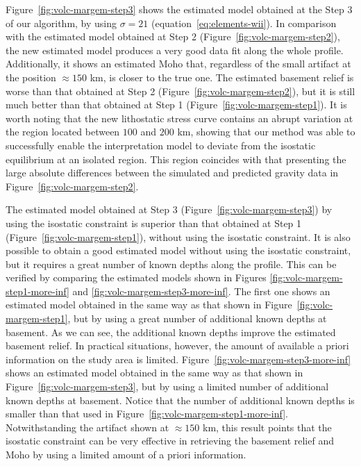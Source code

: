 \documentclass[manuscript]{geophysics}
\begin{document}
Figure~\ref{fig:volc-margem-step3} shows the estimated model obtained at the Step 3
of our algorithm, by using $\sigma = 21$ (equation~\ref{eq:elements-wii}). 
In comparison with the estimated model obtained at Step 2 
(Figure~\ref{fig:volc-margem-step2}), the new estimated model produces a very good 
data fit along the whole profile. Additionally, it shows an estimated Moho that,
regardless of the small artifact at the position $\approx 150$ km, is
closer to the true one.
The estimated basement relief is worse than that obtained at Step 2
(Figure~\ref{fig:volc-margem-step2}), but it is still much better than that obtained
at Step 1 (Figure~\ref{fig:volc-margem-step1}).
It is worth noting that the new lithostatic stress curve contains an abrupt variation
at the region located between $100$ and $200$ km,
showing that our method was able to successfully enable 
the interpretation model to deviate from the isostatic equilibrium at an
isolated region. This region coincides with that presenting the large absolute 
differences between the simulated and predicted gravity data in Figure~\ref{fig:volc-margem-step2}.

The estimated model obtained at Step 3 (Figure~\ref{fig:volc-margem-step3})
by using the isostatic constraint is superior than that
obtained at Step 1 (Figure~\ref{fig:volc-margem-step1}),
without using the isostatic constraint.
It is also possible to obtain a good estimated model without using the 
isostatic constraint, but it requires a great number of known depths
along the profile. This can be verified by comparing the estimated models
shown in Figures \ref{fig:volc-margem-step1-more-inf} and
\ref{fig:volc-margem-step3-more-inf}. The first one shows an estimated model
obtained in the same way as that shown in 
Figure~\ref{fig:volc-margem-step1}, but by using a great number of additional 
known depths at basement. As we can see, the additional known depths
improve the estimated basement relief.
In practical situations, however, the amount of available a priori 
information on the study area is limited.
Figure~\ref{fig:volc-margem-step3-more-inf} shows an estimated model
obtained in the same way as that shown in Figure~\ref{fig:volc-margem-step3},
but by using a limited number of additional known depths at basement.
Notice that the number of additional known depths is smaller than that
used in Figure~\ref{fig:volc-margem-step1-more-inf}.
Notwithstanding the artifact shown at $\approx 150$ km,
this result points that the isostatic constraint can be very effective in 
retrieving the basement relief and Moho by using a limited amount of
a priori information. 
\end{document}
